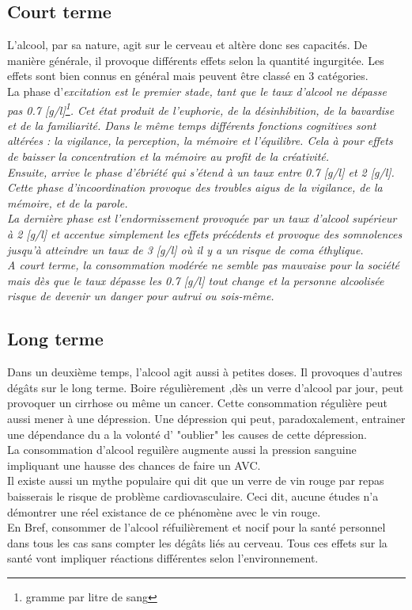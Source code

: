 \documentclass[a4paper, 12pt]{extarticle}
\begin{document}
  \subsection{Court terme}
  L'alcool, par sa nature, agit sur le cerveau et altère donc ses capacités. De manière générale, il provoque différents effets selon la quantité ingurgitée. Les effets sont bien connus en général mais peuvent être classé en 3 catégories.\\
  La phase d'\em{}excitation\em{} est le premier stade, tant que le taux d'alcool ne dépasse pas 0.7 [g/l]\footnote{gramme par litre de sang}. Cet état produit de l'euphorie, de la désinhibition, de la bavardise et de la familiarité. Dans le même temps différents fonctions cognitives sont altérées : la vigilance, la perception, la mémoire et l'équilibre. Cela à pour effets de baisser la concentration et la mémoire au profit de la créativité.\\
  Ensuite, arrive le phase d'\em{}ébriété\em{} qui s'étend à un taux entre 0.7 [g/l] et 2 [g/l]. Cette phase d'incoordination provoque des troubles aigus de la vigilance, de la mémoire, et de la parole.\\
  La dernière phase est l'\em{}endormissement\em{} provoquée par un taux d'alcool supérieur à 2 [g/l] et accentue simplement les effets précédents et provoque des somnolences jusqu'à atteindre un taux de 3 [g/l] où il y a un risque de coma éthylique.\\ 
  A court terme, la consommation modérée ne semble pas mauvaise pour la société mais dès que le taux dépasse les 0.7 [g/l] tout change et la personne alcoolisée risque de devenir un danger pour autrui ou sois-même.
  \subsection{Long terme}
  Dans un deuxième temps, l'alcool agit aussi à petites doses. Il provoques d'autres dégâts sur le long terme.
  Boire régulièrement ,dès un verre d'alcool par jour, peut provoquer un cirrhose ou même un cancer. Cette consommation régulière peut aussi mener à une dépression. Une dépression qui peut, paradoxalement, entrainer une dépendance du a la volonté d' "oublier" les causes de cette dépression.\\
  La consommation d'alcool reguilère augmente aussi la pression sanguine impliquant une hausse des chances de faire un AVC.\\
  Il existe aussi un mythe populaire qui dit que un verre de vin rouge par repas baisserais le risque de problème cardiovasculaire. Ceci dit, aucune études n'a démontrer une réel existance de ce phénomène avec le vin rouge.\\
  En Bref, consommer de l'alcool réfuilièrement et nocif pour la santé personnel dans tous les cas sans compter les dégâts liés au cerveau. Tous ces effets sur la santé vont impliquer réactions différentes selon l'environnement.
\end{document}
